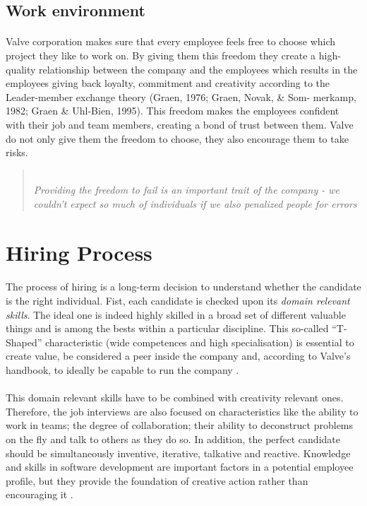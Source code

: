 \documentclass[12pt,twoside,notitle,a4paper]{article}
\begin{document}
\subsection{Work environment}
\paragraph{}Valve corporation makes sure  that every employee feels free to choose which project they like to work on. By giving them this freedom they create a high-quality relationship between the company and the employees which results in the employees giving back loyalty, commitment and creativity according to the Leader-member exchange theory (Graen, 1976; Graen, Novak, \& Som- merkamp, 1982; Graen \& Uhl-Bien, 1995).  
This freedom makes the employees confident with their job and team members, creating a bond of trust between them. Valve do not only give them the freedom to choose, they also encourage them to take risks. 

\blockquote{ \textit{\\Providing the freedom to fail is an important trait of the company - we couldn’t expect so much of individuals if we also penalized people for errors\\}}


\section{Hiring Process}
\paragraph{}The process of hiring is a long-term decision to understand whether the candidate is the right individual. Fist, each candidate is checked upon its \emph{domain relevant skills}. The ideal one is indeed highly skilled in a broad set of different valuable things and is among the bests within a particular discipline. This so-called “T-Shaped” characteristic \citep*{handbookValve} (wide competences and high specialisation) is essential to create value, be considered a peer inside the company and, according to Valve’s handbook, to ideally be capable to run the company \citep*{handbookValve}.

\paragraph{}This domain relevant skills have to be combined with creativity relevant ones. Therefore, the job interviews are also focused on characteristics like the ability to work in teams; the degree of collaboration; their ability to deconstruct problems on the fly and talk to others as they do so. In addition, the perfect candidate should be simultaneously inventive, iterative, talkative and reactive. Knowledge and skills in software development are important factors in a potential employee profile, but they provide the foundation of creative action rather than encouraging it \citep*{unsworth2010employees}.
\end{document}
